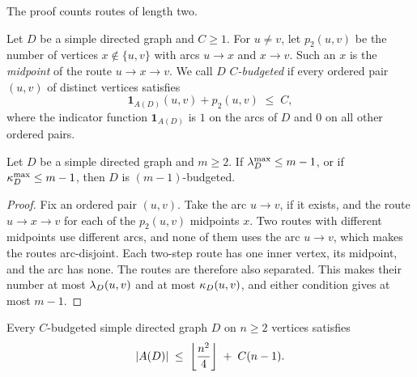 The proof counts routes of length two.

\begin{definition}\label{def:two-step-budget}
Let $D$ be a simple directed graph and $C \ge 1$. For $u\ne v$, let $p_2(u,v)$ be the number of vertices $x \notin \{u,v\}$ with arcs $u\to x$ and $x\to v$. Such an $x$ is the \emph{midpoint} of the route $u \to x \to v$. We call $D$ \emph{$C$-budgeted} if every ordered pair $(u,v)$ of distinct vertices satisfies
\[
    \mathbf{1}_{A(D)}(u,v) + p_2(u,v) \;\le\; C ,
\]
where the indicator function $\mathbf{1}_{A(D)}$ is $1$ on the arcs of $D$ and $0$ on all other ordered pairs.
\end{definition}

\begin{lemma}\label{lem:feasible-budgeted}
Let $D$ be a simple directed graph and $m \ge 2$. If $\lambda^{\max}_D \le m-1$, or if $\kappa^{\max}_D \le m-1$, then $D$ is $(m-1)$-budgeted.
\end{lemma}

\begin{proof}
Fix an ordered pair $(u,v)$.
Take the arc $u\to v$, if it exists, and the route $u\to x\to v$ for each of the $p_2(u,v)$ midpoints $x$.
Two routes with different midpoints use different arcs, and none of them uses the arc $u\to v$, which makes the routes arc-disjoint.
Each two-step route has one inner vertex, its midpoint, and the arc has none.
The routes are therefore also separated.
This makes their number at most $\lambda_D(u,v)$ and at most $\kappa_D(u,v)$, and either condition gives at most $m-1$.
\end{proof}

\begin{lemma}\label{lem:two-step-budget}
Every $C$-budgeted simple directed graph $D$ on $n \ge 2$ vertices satisfies
\[
    |A(D)| \;\le\; \left\lfloor \frac{n^2}{4} \right\rfloor \;+\; C(n-1).
\]
\end{lemma}

